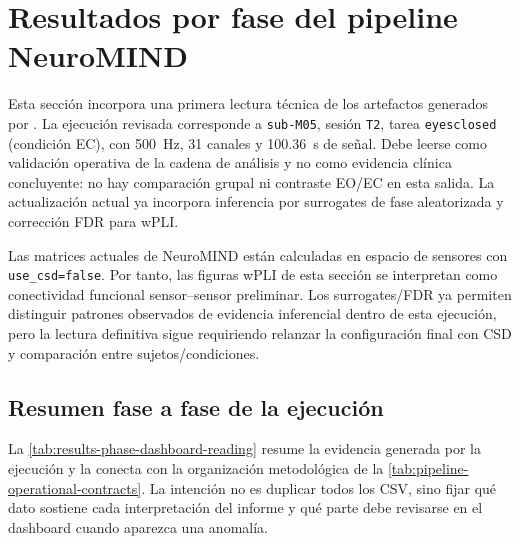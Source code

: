 \section{Resultados por fase del pipeline NeuroMIND}

Esta sección incorpora una primera lectura técnica de los artefactos generados por . La ejecución revisada corresponde a \texttt{sub-M05}, sesión \texttt{T2}, tarea \texttt{eyesclosed} (condición EC), con \SI{500}{Hz}, 31 canales y \SI{100.36}{s} de señal. Debe leerse como validación operativa de la cadena de análisis y no como evidencia clínica concluyente: no hay comparación grupal ni contraste EO/EC en esta salida. La actualización actual ya incorpora inferencia por surrogates de fase aleatorizada y corrección FDR para wPLI.

\begin{decisionmetodologica}
Las matrices actuales de NeuroMIND están calculadas en espacio de sensores con \texttt{use\_csd=false}. Por tanto, las figuras wPLI de esta sección se interpretan como conectividad funcional sensor--sensor preliminar. Los surrogates/FDR ya permiten distinguir patrones observados de evidencia inferencial dentro de esta ejecución, pero la lectura definitiva sigue requiriendo relanzar la configuración final con CSD y comparación entre sujetos/condiciones.
\end{decisionmetodologica}

\subsection{Resumen fase a fase de la ejecución}

La \cref{tab:results-phase-dashboard-reading} resume la evidencia generada por la ejecución y la conecta con la organización metodológica de la \cref{tab:pipeline-operational-contracts}. La intención no es duplicar todos los CSV, sino fijar qué dato sostiene cada interpretación del informe y qué parte debe revisarse en el dashboard cuando aparezca una anomalía.

